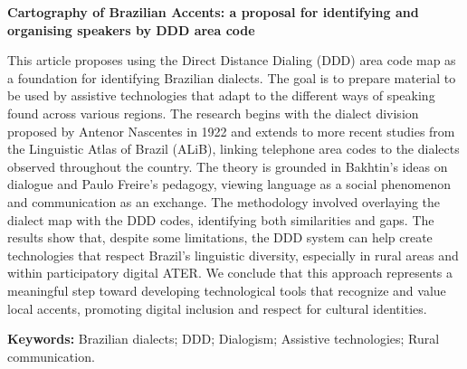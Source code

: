 	\begin{center}
		\textbf{\large Cartography of Brazilian Accents: a proposal for identifying and organising speakers by DDD area code}
	\end{center}	
	\begin{resumo}[Abstract] %
This article proposes using the Direct Distance Dialing (DDD) area code map as a foundation for identifying Brazilian dialects. The goal is to prepare material to be used by assistive technologies that adapt to the different ways of speaking found across various regions. The research begins with the dialect division proposed by Antenor Nascentes in 1922 and extends to more recent studies from the Linguistic Atlas of Brazil (ALiB), linking telephone area codes to the dialects observed throughout the country. The theory is grounded in Bakhtin’s ideas on dialogue and Paulo Freire’s pedagogy, viewing language as a social phenomenon and communication as an exchange. The methodology involved overlaying the dialect map with the DDD codes, identifying both similarities and gaps. The results show that, despite some limitations, the DDD system can help create technologies that respect Brazil’s linguistic diversity, especially in rural areas and within participatory digital ATER. We conclude that this approach represents a meaningful step toward developing technological tools that recognize and value local accents, promoting digital inclusion and respect for cultural identities.
\\[0.5em]

		
		\vspace*{0.5cm}
		
		\noindent\textbf{{Keywords: }} Brazilian dialects; DDD; Dialogism; Assistive technologies; Rural communication.
		
		
	\end{resumo}
	

	
	

	
